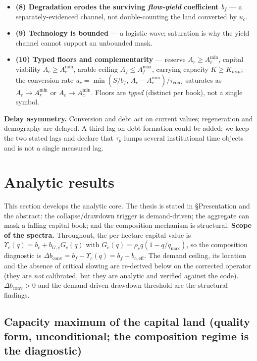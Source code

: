 \documentclass[11pt]{article}
\begin{document}
\begin{itemize}
\item \textbf{(8) Degradation erodes the surviving \emph{flow-yield} coefficient $b_f$} --- a separately-evidenced channel, not double-counting the land converted by $u_c$.
\item \textbf{(9) Technology is bounded} --- a logistic wave; saturation is why the yield channel cannot support an unbounded mask.
\item \textbf{(10) Typed floors and complementarity} --- reserve $A_r\ge A_r^{\min}$, capital viability $A_c\ge A_c^{\min}$, arable ceiling $A_f\le A_f^{\max}$, carrying capacity $K\ge K_{min}$; the conversion rate $u_c=\min(S/b_f,\,A_c-A_c^{\min})/\tau_{\mathrm{conv}}$ saturates as $A_r\to A_r^{\min}$ or $A_c\to A_c^{\min}$. Floors are \emph{typed} (distinct per book), not a single symbol.
\end{itemize}

\textbf{Delay asymmetry.} Conversion and debt act on current values; regeneration and demography are delayed. A third lag on debt formation could be added; we keep the two stated lags and declare that $\tau_p$ lumps several institutional time objects and is not a single measured lag.

\section{Analytic results}

This section develops the analytic core. The thesis is stated in \S Presentation and the abstract: the collapse/drawdown trigger is demand-driven; the aggregate can mask a falling capital book; and the composition mechanism is structural. \textbf{Scope of the spectra.} Throughout, the per-hectare capital value is $\Upsilon_c(q)=b_c+b_{G,c}G_c(q)$ with $G_c(q)=\rho_c q(1-q/q_{\max})$, so the composition diagnostic is $\Delta b_{\mathrm{conv}}=b_f-\Upsilon_c(q)=b_f-b_{c,\mathrm{eff}}$. The demand ceiling, its location and the absence of critical slowing are re-derived below on the corrected operator (they are \emph{not} calibrated, but they are analytic and verified against the code). $\Delta b_{\mathrm{conv}}>0$ and the demand-driven drawdown threshold are the structural findings.

\subsection{Capacity maximum of the capital land (quality form, unconditional; the composition regime is the diagnostic)}
\end{document}
